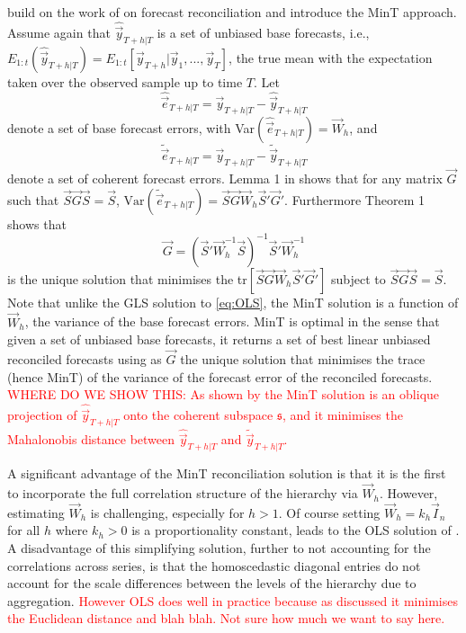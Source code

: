 \documentclass[graybox]{svmult}
\begin{document}
\cite{WicEtAl2019} build on the work of \citet{HynEtAl2011} on forecast reconciliation and introduce the MinT approach. Assume again that $\hat{\vec{y}}_{T+h|T}$ is a set of unbiased base forecasts, i.e., $E_{1:t}(\hat{\vec{y}}_{T+h|T})= E_{1:t}[\vec{y}_{T+h}|\vec{y}_1,...,\vec{y}_T]$, the true mean with the expectation taken over the observed sample up to time $T$.
Let
\begin{equation}\label{eq:base errors}
\hat{\vec{e}}_{T+h|T} = \vec{y}_{T+h|T}-\hat{\vec{y}}_{T+h|T}
\end{equation}
denote a set of base forecast errors, with Var$(\hat{\vec{e}}_{T+h|T})=\vec{W}_h$, and
\begin{equation*}
\tilde{\vec{e}}_{T+h|T} = \vec{y}_{T+h|T}-\tilde{\vec{y}}_{T+h|T}
\end{equation*} denote a set of coherent forecast errors. Lemma 1 in \cite{WicEtAl2019} shows that for any matrix $\vec{G}$ such that $\vec{S}\vec{G}\vec{S}=\vec{S}$, $\text{Var}(\tilde{\vec{e}}_{T+h|T})=\vec{S}\vec{G}\vec{W}_h\vec{S}'\vec{G}'
$. Furthermore Theorem 1 shows that
\begin{equation} \label{eq:MinT}
\vec{G} = (\vec{S}'{\vec{W}}^{-1}_h\vec{S})^{-1}\vec{S}'{\vec{W}}^{-1}_h
\end{equation}
is the unique solution that minimises the tr$[\vec{S}\vec{G}\vec{W}_h\vec{S}'\vec{G}']$ subject to $\vec{S}\vec{G}\vec{S}=\vec{S}$. Note that unlike the GLS solution to \eqref{eq:OLS}, the MinT solution is a function of $\vec{W}_h$, the variance of the base forecast errors. MinT is optimal in the sense that given a set of unbiased base forecasts, it returns a set of best linear unbiased reconciled forecasts using as $\vec{G}$ the unique solution that minimises the trace (hence MinT) of the variance of the forecast error of the reconciled forecasts. \textcolor{red}{WHERE DO WE SHOW THIS: As shown by \cite{WicEtAl2019} the MinT solution is an oblique projection of $\hat{\vec{y}}_{T+h|T}$ onto the coherent subspace $\mathfrak{s}$, and it minimises the Mahalonobis distance between $\hat{\vec{y}}_{T+h|T}$ and $\tilde{\vec{y}}_{T+h|T}$.}

A significant advantage of the MinT reconciliation solution is that it is the first to incorporate the full correlation structure of the hierarchy via ${\vec{W}}_{h}$. However, estimating ${\vec{W}}_{h}$ is challenging, especially for $h>1$. Of course setting ${\vec{W}}_{h}=k_h\vec{I}_n$ for all $h$ where $k_h>0$ is a proportionality constant, leads to the OLS solution of \cite{HynEtAl2011}. A disadvantage of this simplifying solution, further to not accounting for the correlations across series, is that the homoscedastic diagonal entries do not account for the scale differences between the levels of the hierarchy due to aggregation. \textcolor{red}{However OLS does well in practice because as discussed it minimises the Euclidean distance and blah blah. Not sure how much we want to say here.}
\end{document}
